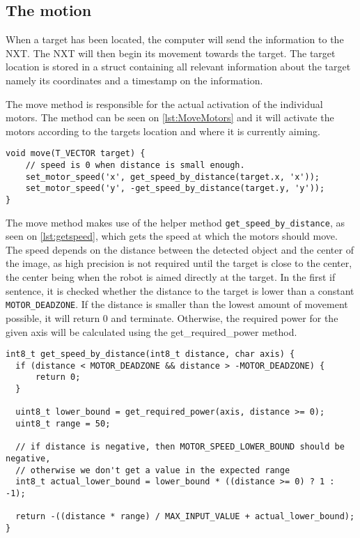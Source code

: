 \subsection{The motion}
When a target has been located, the computer will send the information to the NXT.
The NXT will then begin its movement towards the target.
The target location is stored in a struct containing all relevant information about the target namely its coordinates and a timestamp on the information.

The move method is responsible for the actual activation of the individual motors.
The method can be seen on \autoref{lst:MoveMotors} and it will activate the motors according to the targets location and where it is currently aiming.
\begin{lstlisting}[language=CSharp,caption={move method from movement.c},label={lst:MoveMotors}]
  void move(T_VECTOR target) {
    // speed is 0 when distance is small enough.
    set_motor_speed('x', get_speed_by_distance(target.x, 'x'));
    set_motor_speed('y', -get_speed_by_distance(target.y, 'y'));
}
\end{lstlisting}

The move method makes use of the helper method \texttt{get\_speed\_by\_distance}, as seen on \autoref{lst:getspeed}, which gets the speed at which the motors should move.
The speed depends on the distance between the detected object and the center of the image, as high precision is not required until the target is close to the center, the center being when the robot is aimed directly at the target.
In the first if sentence, it is checked whether the distance to the target is lower than a constant \texttt{MOTOR\_DEADZONE}.
If the distance is smaller than the lowest amount of movement possible, it will return 0 and terminate.
Otherwise, the required power for the given axis will be calculated using the get\_required\_power method.
\begin{lstlisting}[language=CSharp,caption={get\_speed\_by\_distance method from movement.c},label={lst:getspeed}]
int8_t get_speed_by_distance(int8_t distance, char axis) {
  if (distance < MOTOR_DEADZONE && distance > -MOTOR_DEADZONE) {
      return 0;
  }

  uint8_t lower_bound = get_required_power(axis, distance >= 0);
  uint8_t range = 50;

  // if distance is negative, then MOTOR_SPEED_LOWER_BOUND should be negative,
  // otherwise we don't get a value in the expected range
  int8_t actual_lower_bound = lower_bound * ((distance >= 0) ? 1 : -1);

  return -((distance * range) / MAX_INPUT_VALUE + actual_lower_bound);
}
\end{lstlisting}

